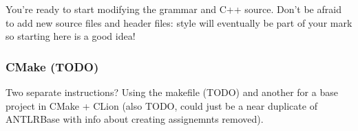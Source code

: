 \documentclass[../setup.tex]{subfiles}
\begin{document}
You're ready to start modifying the grammar and C++ source. Don't be afraid to add new source
files and header files: style will eventually be part of your mark so starting here is a good idea!

\subsubsection{CMake (TODO)}

Two separate instructions? Using the makefile (TODO) and another for a base project in CMake +
CLion (also TODO, could just be a near duplicate of ANTLRBase with info about creating assignemnts
removed).
\end{document}
